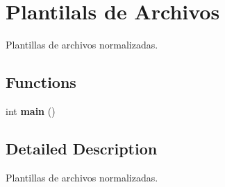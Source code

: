 \hypertarget{group__plantilla}{}\section{Plantilals de Archivos}
\label{group__plantilla}


Plantillas de archivos normalizadas.  


\subsection*{Functions}
\begin{DoxyCompactItemize}
\item 
\mbox{\label{group__plantilla_gae66f6b31b5ad750f1fe042a706a4e3d4}} 
int {\bfseries main} ()
\end{DoxyCompactItemize}


\subsection{Detailed Description}
Plantillas de archivos normalizadas. 

